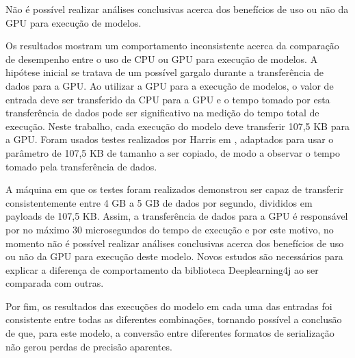Não é possível realizar análises conclusivas acerca dos benefícios de uso ou não da GPU para execução de modelos.

Os resultados mostram um comportamento inconsistente acerca da comparação de desempenho entre o uso de CPU ou GPU para execução de modelos. A hipótese inicial se tratava de um possível gargalo durante a transferência de dados para a GPU. Ao utilizar a GPU para a execução de modelos, o valor de entrada deve ser transferido da CPU para a GPU e o tempo tomado por esta transferência de dados pode ser significativo na medição do tempo total de execução. Neste trabalho, cada execução do modelo deve transferir 107,5 KB para a GPU. Foram usados testes realizados por Harris em \cite{harris_2012}, adaptados para usar o parâmetro de 107,5 KB de tamanho a ser copiado, de modo a observar o tempo tomado pela transferência de dados.

A máquina em que os testes foram realizados demonstrou ser capaz de transferir consistentemente entre 4 GB a 5 GB de dados por segundo, divididos em payloads de 107,5 KB. Assim, a transferência de dados para a GPU é responsável por no máximo 30 microsegundos do tempo de execução e por este motivo, no momento não é possível realizar análises conclusivas acerca dos benefícios de uso ou não da GPU para execução deste modelo. Novos estudos são necessários para explicar a diferença de comportamento da biblioteca Deeplearning4j ao ser comparada com outras.

Por fim, os resultados das execuções do modelo em cada uma das entradas foi consistente entre todas as diferentes combinações, tornando possível a conclusão de que, para este modelo, a conversão entre diferentes formatos de serialização não gerou perdas de precisão aparentes.